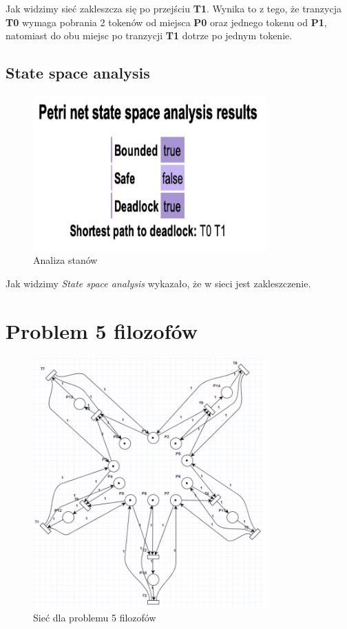 \documentclass{article}
\begin{document}
Jak widzimy sieć zakleszcza się po przejściu \textbf{T1}.
Wynika to z tego, że tranzycja \textbf{T0} wymaga pobrania 2 tokenów od miejsca 
\textbf{P0} oraz jednego tokenu od \textbf{P1}, natomiast do obu miejsc po 
tranzycji \textbf{T1} dotrze po jednym tokenie.

\subsection{State space analysis}
\begin{figure}[H]
    \centering
    \includegraphics[width=0.8\textwidth, height=0.4\textheight]{zad7_analiza.png}
    \caption{Analiza stanów}
\end{figure}

Jak widzimy \textit{State space analysis} wykazało, że w sieci jest zakleszczenie.

\section{Problem 5 filozofów}
\begin{figure}[H]
    \centering
    \includegraphics[width=0.8\textwidth, height=0.7\textheight]{zad8.png}
    \caption{Sieć dla problemu 5 filozofów}
\end{figure}
\end{document}
